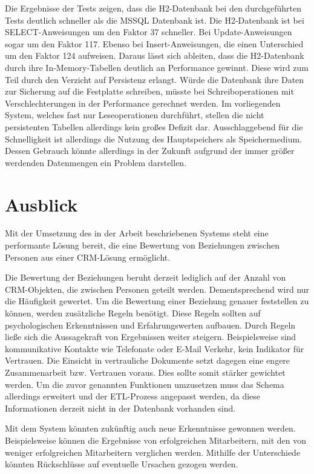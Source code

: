 Die Ergebnisse der Tests zeigen, dass die H2-Datenbank bei den durchgeführten Tests deutlich schneller als die MSSQL Datenbank ist. Die H2-Datenbank ist bei SELECT-Anweisungen um den Faktor 37 schneller. Bei Update-Anweisungen sogar um den Faktor 117. Ebenso bei Insert-Anweisungen, die einen Unterschied um den Faktor 124 aufweisen. Daraus lässt sich ableiten, dass die H2-Datenbank durch ihre In-Memory-Tabellen deutlich an Performance gewinnt. Diese wird zum Teil durch den Verzicht auf Persistenz erlangt. Würde die Datenbank ihre Daten zur Sicherung auf die Festplatte schreiben, müsste bei Schreiboperationen mit Verschlechterungen in der Performance gerechnet werden. Im vorliegenden System, welches fast nur Leseoperationen durchführt, stellen die nicht persistenten Tabellen allerdings kein großes Defizit dar. Ausschlaggebend für die Schnelligkeit ist allerdings die Nutzung des Hauptspeichers als Speichermedium. Dessen Gebrauch könnte allerdings in der Zukunft aufgrund der immer größer werdenden Datenmengen ein Problem darstellen.  

\section{Ausblick}
\label{ch:Ergebnis:sec:Ausblick}

Mit der Umsetzung des in der Arbeit beschriebenen Systems steht eine performante Lösung bereit, die eine Bewertung von Beziehungen zwischen Personen aus einer CRM-Lösung ermöglicht.

Die Bewertung der Beziehungen beruht derzeit lediglich auf der Anzahl von CRM-Objekten, die zwischen Personen geteilt werden. Dementsprechend wird nur die Häufigkeit gewertet. Um die Bewertung einer Beziehung genauer feststellen zu können, werden zusätzliche Regeln benötigt. Diese Regeln sollten auf psychologischen Erkenntnissen und Erfahrungswerten aufbauen. Durch Regeln ließe sich die Aussagekraft von Ergebnissen weiter steigern. Beispielsweise sind kommunikative Kontakte wie Telefonate oder E-Mail Verkehr, kein Indikator für Vertrauen. Die Einsicht in vertrauliche Dokumente setzt dagegen eine engere Zusammenarbeit bzw. Vertrauen voraus. Dies sollte somit stärker gewichtet werden. Um die zuvor genannten Funktionen umzusetzen muss das Schema allerdings erweitert und der ETL-Prozess angepasst werden, da diese Informationen derzeit nicht in der Datenbank vorhanden sind.

Mit dem System könnten zukünftig auch neue Erkenntnisse gewonnen werden. Beispielsweise können die Ergebnisse von erfolgreichen Mitarbeitern, mit den von weniger erfolgreichen Mitarbeitern verglichen werden. Mithilfe der Unterschiede könnten Rückschlüsse auf eventuelle Ursachen gezogen werden.

